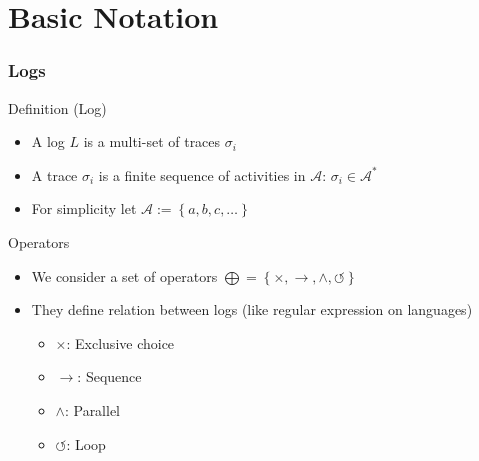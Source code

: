 \documentclass[18pt]{beamer}
\begin{document}
\section{Basic Notation} %
\label{sec:notation_and_basics}
\begin{frame}
    \frametitle{Logs}    
    \begin{block}{Definition (Log)}
    	\begin{itemize}
			\item A log $L$ is a multi-set of traces $\sigma_i$
			\item A trace $\sigma_i$ is a finite sequence of activities in $\mathcal{A}$: $\sigma_i \in \mathcal{A}^*$ 
			\item For simplicity let $\mathcal{A} := \left\{ a, b, c, \dots \right\}$
    	\end{itemize}
    \end{block}
        \begin{block}{Operators}
    	\begin{itemize}
			\item We consider a set of operators $\bigoplus = \left\{ \times, \rightarrow, \wedge, \circlearrowleft \right\}$

			\item They define relation between logs (like regular expression on languages)
			\begin{itemize}
				\item $\times$: Exclusive choice
				\item $\rightarrow$: Sequence
				\item $\wedge$: Parallel
				\item $\circlearrowleft $: Loop
			\end{itemize}
    	\end{itemize}
    \end{block}
\end{frame}
\end{document}
